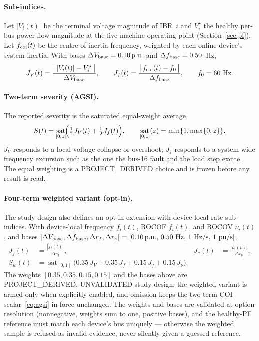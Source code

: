 \documentclass[12pt,a4paper]{article}
\DeclareMathOperator{\sat}{sat}
\newcommand{\pu}{\ifmmode\,\mathrm{p.u.}\else\ p.u.\fi}
\begin{document}
\paragraph{Sub-indices.}
Let $|V_i(t)|$ be the terminal voltage magnitude of IBR~$i$ and $V_i^{\star}$
the healthy per-bus power-flow magnitude at the five-machine operating point
(Section~\ref{sec:pf}).  Let $f_{\rm coi}(t)$ be the centre-of-inertia
frequency, weighted by each online device's system inertia.  With bases
$\Delta V_{\rm base}=0.10\pu$ and $\Delta f_{\rm base}=0.50$~Hz,
\begin{equation}
  J_V(t)=\frac{\bigl|\,|V_i(t)|-V_i^{\star}\,\bigr|}{\Delta V_{\rm base}},
  \qquad
  J_f(t)=\frac{\bigl|\,f_{\rm coi}(t)-f_0\,\bigr|}{\Delta f_{\rm base}},
  \qquad f_0=60~\mathrm{Hz}.
  \label{eq:jvjf}
\end{equation}

\paragraph{Two-term severity (AGSI).}
The reported severity is the saturated equal-weight average
\begin{equation}
  S(t)=\sat_{[0,1]}\!\Bigl(\tfrac12 J_V(t)+\tfrac12 J_f(t)\Bigr),
  \qquad
  \sat_{[0,1]}(z)=\min\{1,\max\{0,z\}\}.
  \label{eq:agsi}
\end{equation}
$J_V$ responds to a local voltage collapse or overshoot; $J_f$ responds to a
system-wide frequency excursion such as the one the bus-16 fault and the load
step excite.  The equal weighting is a \textsf{PROJECT\_DERIVED}
choice and is frozen before any result is read.

\paragraph{Four-term weighted variant (opt-in).}
The study design also defines an opt-in extension with device-local rate
sub-indices.  With device-local frequency $f_i(t)$, ROCOF
$\dot f_i(t)$, and ROCOV $\dot\nu_i(t)$, and bases
$[\Delta V_{\rm base},\Delta f_{\rm base},\Delta r_{f},\Delta r_{\nu}]
=[0.10\pu,\,0.50~\mathrm{Hz},\,1~\mathrm{Hz/s},\,1~\mathrm{pu/s}]$,
\begin{equation}
\begin{aligned}
  J_{\dot f}(t)&=\frac{|\dot f_i(t)|}{\Delta r_{f}},&
  J_{\dot\nu}(t)&=\frac{|\dot\nu_i(t)|}{\Delta r_{\nu}},\\
  S_{w}(t)&=\sat_{[0,1]}\!\bigl(
      0.35\,J_V+0.35\,J_f+0.15\,J_{\dot f}+0.15\,J_{\dot\nu}\bigr).&&
\end{aligned}
\label{eq:weighted}
\end{equation}
The weights $[0.35,0.35,0.15,0.15]$ and the bases above are
\textsf{PROJECT\_DERIVED, UNVALIDATED} study design: the weighted variant is
armed only when explicitly enabled, and omission keeps the two-term
COI scalar~\eqref{eq:agsi} in force unchanged.  The weights and bases are
validated at option resolution (nonnegative, weights sum to one, positive
bases), and the healthy-PF reference must match each device's bus uniquely ---
otherwise the weighted sample is refused as invalid evidence, never silently
given a guessed reference.
\end{document}
